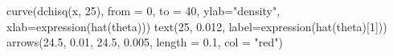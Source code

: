 \begin{Schunk}
\begin{Sinput}
 curve(dchisq(x, 25), from = 0, to = 40, ylab="density", xlab=expression(hat(theta)))
 text(25, 0.012, label=expression(hat(theta)[1]))
 arrows(24.5, 0.01, 24.5, 0.005, length = 0.1, col = "red")
\end{Sinput}
\end{Schunk}
